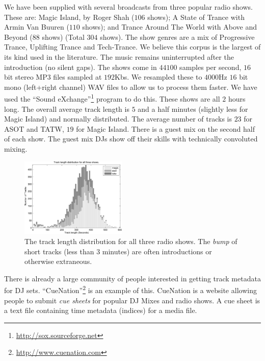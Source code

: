 \documentclass[twocolumn]{article}
\begin{document}
	We have been supplied with several broadcasts from three popular radio shows. These are: Magic Island, by Roger Shah ($106$ shows); A State of Trance with Armin Van Buuren ($110$ shows); and Trance Around The World with Above and Beyond ($88$ shows) (Total $304$ shows). The show genres are a mix of Progressive Trance, Uplifting Trance and Tech-Trance. We believe this corpus is the largest of its kind used \cite{peiszer2008automatic} in the literature.  
	The music remains uninterrupted after the introduction (no silent gaps). 
	The shows come in $44100$ samples per second, $16$ bit stereo MP3 files sampled at $192$Kbs. We resampled these to $4000$Hz $16$ bit mono (left+right channel) WAV files to allow us to process them faster. We have used the ``Sound eXchange''\footnote{\url{http://sox.sourceforge.net}}  program to do this. These shows are all $2$ hours long. The overall average track length is $5$ and a half minutes (slightly less for Magic Island) and normally distributed. The average number of tracks is $23$ for ASOT and TATW, $19$ for Magic Island. There is a guest mix on the second half of each show. The guest mix DJs show off their skills with technically convoluted mixing.
	
	\begin{figure}
		\centering
		\includegraphics[width=0.45\textwidth]{images/tracklength.pdf}
		
		\caption{The track length distribution for all three radio shows. The \textit{bump} of short tracks (less than $3$ minutes) are often introductions or otherwise extraneous.}
		\label{fig:tracklengths}
	\end{figure} 
	
	There is already a large community of people interested in getting track metadata for DJ sets. ``CueNation''\footnote{\url{http://www.cuenation.com}} is an example of this. CueNation is a website allowing people to submit \textit{cue sheets} for popular DJ Mixes and radio shows. A cue sheet is a text file containing time metadata (indices) for a media file.
	
\end{document}
